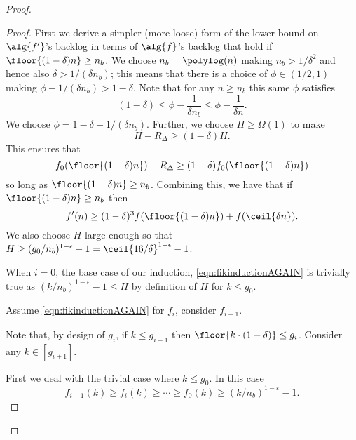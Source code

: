 \begin{proof}
\begin{proof}
  First we derive a simpler (more loose) form of the lower bound
  on $\alg{f'}$'s backlog in terms of $\alg{f}$'s backlog that
  hold if  $\floor{(1-\delta)n} \ge n_b$. We choose $n_b=
  \polylog(n)$ making $n_b > 1/\delta^2$ and hence also $\delta >
  1/(\delta n_b)$; this means that there is a choice of $\phi \in
  (1/2, 1)$ making $\phi - 1/(\delta n_b) > 1-\delta$. Note that
  for any $n\ge n_b$ this same $\phi$ satisfies $$(1-\delta) \le
  \phi - \frac{1}{\delta n_b} \le \phi - \frac{1}{ \delta n}.$$
  We choose $\phi = 1-\delta + 1/(\delta n_b)$. Further, we
  choose $H \ge \Omega(1)$ to make $$ H - R_\Delta \ge
  (1-\delta)H.$$ This ensures that $$f_0(\floor{(1-\delta) n}) -
  R_\Delta \ge (1-\delta)f_0(\floor{(1-\delta)n})$$ so long as
  $\floor{(1-\delta)n} \ge n_b$. Combining this, we have that if
  $\floor{(1-\delta)n}\ge n_b$ then 
  \begin{equation}
    \label{eq:simpleramplemmaobliviousforthmpf}
  f'(n) \ge (1-\delta)^3 f(\floor{(1-\delta)n}) + f(\ceil{\delta n}).
  \end{equation}
  We also choose $H$ large enough so that $H \ge
  (g_0/n_b)^{1-\epsilon}-1 = \ceil{16/\delta}^{1-\epsilon}-1$.

  When $i=0$, the base case of our induction,
  \eqref{eqn:fikinductionAGAIN} is trivially true as
  $(k/n_b)^{1-\epsilon} - 1 \le H$ by definition of $H$ for $k\le g_0$.

  Assume \eqref{eqn:fikinductionAGAIN} for $f_i$, consider $f_{i+1}$. 

  Note that, by design of $g_i$, if $k \le g_{i+1}$ then $\floor{k\cdot (1-\delta)} \le g_i$.
  Consider any $k\in [g_{i+1}]$. 

  First we deal with the trivial
  case where $k \le g_0$. In this case
  $$f_{i+1}(k) \ge f_i(k) \ge \cdots \ge f_0(k) \ge (k/n_b)^{1-\varepsilon} -1.$$


\end{proof}
\end{proof}
